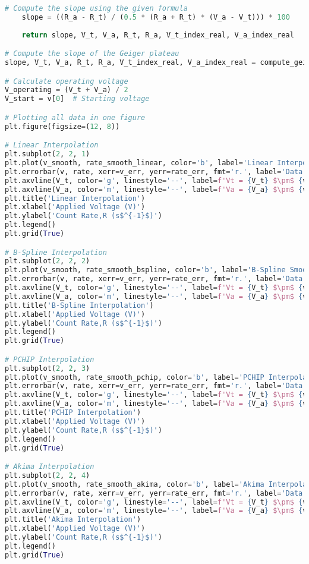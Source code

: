 \documentclass[a4paper,11pt]{article}
\begin{document}
\begin{lstlisting}[language=Python]
    # Compute the slope using the given formula
    slope = ((R_a - R_t) / (0.5 * (R_a + R_t) * (V_a - V_t))) * 100
    
    return slope, V_t, V_a, R_t, R_a, V_t_index_real, V_a_index_real

# Compute the slope of the Geiger plateau
slope, V_t, V_a, R_t, R_a, V_t_index_real, V_a_index_real = compute_geiger_plateau_slope(v, rate)

# Calculate operating voltage
V_operating = (V_t + V_a) / 2
V_start = v[0]  # Starting voltage

# Plotting all data in one figure
plt.figure(figsize=(12, 8))

# Linear Interpolation
plt.subplot(2, 2, 1)
plt.plot(v_smooth, rate_smooth_linear, color='b', label='Linear Interpolation')
plt.errorbar(v, rate, xerr=v_err, yerr=rate_err, fmt='r.', label='Data Points with Error', capsize=5, linewidth=0.5)
plt.axvline(V_t, color='g', linestyle='--', label=f'Vt = {V_t} $\pm$ {v_err[V_t_index_real]} V')
plt.axvline(V_a, color='m', linestyle='--', label=f'Va = {V_a} $\pm$ {v_err[V_a_index_real]} V')
plt.title('Linear Interpolation')
plt.xlabel('Applied Voltage (V)')
plt.ylabel('Count Rate,R (s$^{-1}$)')
plt.legend()
plt.grid(True)

# B-Spline Interpolation
plt.subplot(2, 2, 2)
plt.plot(v_smooth, rate_smooth_bspline, color='b', label='B-Spline Smoothed Curve')
plt.errorbar(v, rate, xerr=v_err, yerr=rate_err, fmt='r.', label='Data Points with Error', capsize=5, linewidth=0.5)
plt.axvline(V_t, color='g', linestyle='--', label=f'Vt = {V_t} $\pm$ {v_err[V_t_index_real]} V')
plt.axvline(V_a, color='m', linestyle='--', label=f'Va = {V_a} $\pm$ {v_err[V_a_index_real]} V')
plt.title('B-Spline Interpolation')
plt.xlabel('Applied Voltage (V)')
plt.ylabel('Count Rate,R (s$^{-1}$)')
plt.legend()
plt.grid(True)

# PCHIP Interpolation
plt.subplot(2, 2, 3)
plt.plot(v_smooth, rate_smooth_pchip, color='b', label='PCHIP Interpolation')
plt.errorbar(v, rate, xerr=v_err, yerr=rate_err, fmt='r.', label='Data Points with Error', capsize=5, linewidth=0.5)
plt.axvline(V_t, color='g', linestyle='--', label=f'Vt = {V_t} $\pm$ {v_err[V_t_index_real]} V')
plt.axvline(V_a, color='m', linestyle='--', label=f'Va = {V_a} $\pm$ {v_err[V_a_index_real]} V')
plt.title('PCHIP Interpolation')
plt.xlabel('Applied Voltage (V)')
plt.ylabel('Count Rate,R (s$^{-1}$)')
plt.legend()
plt.grid(True)

# Akima Interpolation
plt.subplot(2, 2, 4)
plt.plot(v_smooth, rate_smooth_akima, color='b', label='Akima Interpolation')
plt.errorbar(v, rate, xerr=v_err, yerr=rate_err, fmt='r.', label='Data Points with Error', capsize=5, linewidth=0.5)
plt.axvline(V_t, color='g', linestyle='--', label=f'Vt = {V_t} $\pm$ {v_err[V_t_index_real]} V')
plt.axvline(V_a, color='m', linestyle='--', label=f'Va = {V_a} $\pm$ {v_err[V_a_index_real]} V')
plt.title('Akima Interpolation')
plt.xlabel('Applied Voltage (V)')
plt.ylabel('Count Rate,R (s$^{-1}$)')
plt.legend()
plt.grid(True)


\end{lstlisting}
\end{document}
